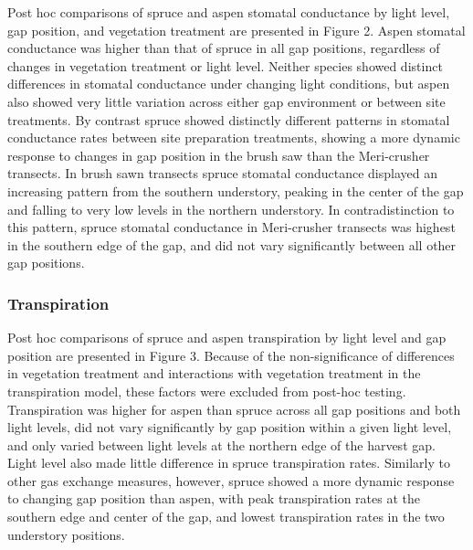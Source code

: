 \documentclass{article}\usepackage[]{graphicx}\usepackage[]{color}
\begin{document}
\begin{multicols}{2}

Post hoc comparisons of spruce and aspen stomatal conductance by light level, gap position, and vegetation treatment are presented in Figure 2. Aspen stomatal conductance was higher than that of spruce in all gap positions, regardless of changes in vegetation treatment or light level. Neither species showed distinct differences in stomatal conductance under changing light conditions, but aspen also showed very little variation across either gap environment or between site treatments. By contrast spruce showed distinctly different patterns in stomatal conductance rates between site preparation treatments, showing a more dynamic response to changes in gap position in the brush saw than the Meri-crusher transects. In brush sawn transects spruce stomatal conductance displayed an increasing pattern from the southern understory, peaking in the center of the gap and falling to very low levels in the northern understory. In contradistinction to this pattern, spruce stomatal conductance in Meri-crusher transects was highest in the southern edge of the gap, and did not vary significantly between all other gap positions.

\subsubsection{Transpiration}

Post hoc comparisons of spruce and aspen transpiration by light level and gap position are presented in Figure 3. Because of the non-significance of differences in vegetation treatment and interactions with vegetation treatment in the transpiration model, these factors were excluded from post-hoc testing. Transpiration was higher for aspen than spruce across all gap positions and both light levels, did not vary significantly by gap position within a given light level, and only varied between light levels at the northern edge of the harvest gap. Light level also made little difference in spruce transpiration rates. Similarly to other gas exchange measures, however, spruce showed a more dynamic response to changing gap position than aspen, with peak transpiration rates at the southern edge and center of the gap, and lowest transpiration rates in the two understory positions. 

\end{multicols}
\end{document}
